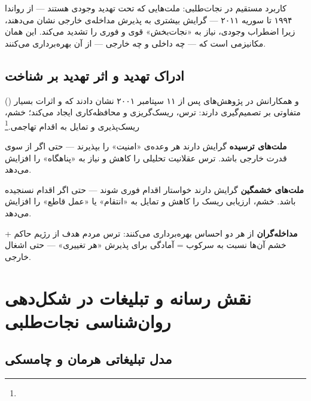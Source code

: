 کاربرد مستقیم در نجات‌طلبی: ملت‌هایی که تحت تهدید وجودی هستند — از رواندا ۱۹۹۴ تا سوریه ۲۰۱۱ — گرایش بیشتری به پذیرش مداخله‌ی خارجی نشان می‌دهند، زیرا اضطراب وجودی، نیاز به «نجات‌بخش» قوی و فوری را تشدید می‌کند. این همان مکانیزمی است که  — چه داخلی و چه خارجی — از آن بهره‌برداری می‌کنند.

\subsection{ادراک تهدید و اثر تهدید بر شناخت}
\label{subsec:ch11-threat-cognition}

 () و همکارانش در پژوهش‌های پس از ۱۱ سپتامبر ۲۰۰۱ نشان دادند که  و  اثرات بسیار متفاوتی بر تصمیم‌گیری دارند: ترس، ریسک‌گریزی و محافظه‌کاری ایجاد می‌کند؛ خشم، ریسک‌پذیری و تمایل به اقدام تهاجمی.\footnote{}

\begin{tcolorbox}[wavebox, title={تحلیل: ترس، خشم، و نجات‌طلبی}]
\textbf{ملت‌های ترسیده} گرایش دارند هر وعده‌ی «امنیت» را بپذیرند — حتی اگر از سوی قدرت خارجی باشد. ترس عقلانیت تحلیلی را کاهش و نیاز به «پناهگاه» را افزایش می‌دهد.

\textbf{ملت‌های خشمگین} گرایش دارند خواستار اقدام فوری شوند — حتی اگر اقدام نسنجیده باشد. خشم، ارزیابی ریسک را کاهش و تمایل به «انتقام» یا «عمل قاطع» را افزایش می‌دهد.

\textbf{مداخله‌گران} از هر دو احساس بهره‌برداری می‌کنند: ترس مردم هدف از رژیم حاکم + خشم آن‌ها نسبت به سرکوب = آمادگی برای پذیرش «هر تغییری» — حتی اشغال خارجی.
\end{tcolorbox}


\section{نقش رسانه و تبلیغات در شکل‌دهی روان‌شناسی نجات‌طلبی}
\label{sec:ch11-propaganda}

\subsection{مدل تبلیغاتی هرمان و چامسکی}
\label{subsec:ch11-propaganda-model}

